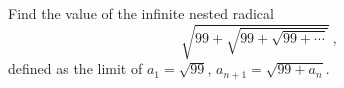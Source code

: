 Find the value of the infinite nested radical
\[
\sqrt{99+\sqrt{99+\sqrt{99+\cdots}}}\ ,
\]
defined as the limit of $a_1=\sqrt{99}$, $a_{n+1}=\sqrt{99+a_n}$.
